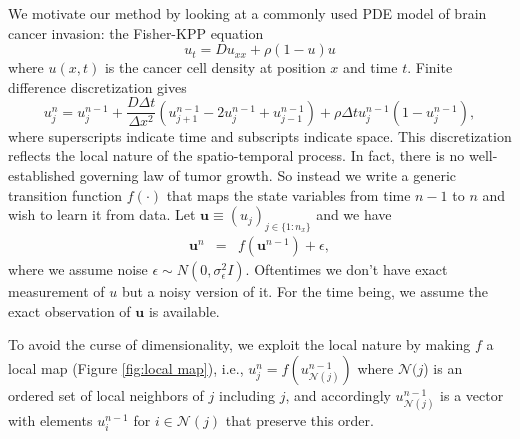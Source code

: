 \documentclass[smallextended,natbib]{svjour3}       %
\begin{document}
We motivate our method by looking at a commonly used PDE model of brain cancer invasion: the Fisher-KPP equation
\[
u_{t}=Du_{xx}+\rho (1-u)u
\]
where $u(x,t)$ is the cancer cell density at position $x$ and time $t$. Finite difference discretization gives 
\[
u_{j}^{n}=u_{j}^{n-1}+\frac{D \Delta t}{\Delta x^{2}}(u_{j+1}^{n-1}-2u_{j}^{n-1}+u_{j-1}^{n-1})+\rho \Delta t u_{j}^{n-1}(1-u_{j}^{n-1}),
\]
where superscripts indicate time and subscripts indicate space. This discretization reflects the local nature of the spatio-temporal process. In fact, there is no well-established governing law of tumor growth. So instead we write a generic transition function $f(\cdot)$ that maps the state variables from time $n-1$ to $n$ and wish to learn it from data. Let $\mathbf{u}\equiv(u_{j})_{j\in\{1:n_{x}\}}$ and we have 
\begin{eqnarray}
\mathbf{u}^{n} & = & f(\mathbf{u}^{n-1})+\epsilon\label{eq:un=00003Df(un-1)},
\end{eqnarray}
where we assume noise $\epsilon\sim N(0,\sigma_{\epsilon}^{2}I)$. Oftentimes we don't have exact measurement of $u$ but a noisy version of it. For the time being, we assume the exact observation of $\mathbf{u}$ is available.

To avoid the curse of dimensionality, we exploit the local nature by making $f$ a local map (Figure \ref{fig:local map}), i.e., $u_{j}^{n}=f(u_{\mathcal{N}(j)}^{n-1})$ where $\mathcal{N}(j$) is an ordered set of local neighbors of $j$ including $j$, and accordingly $u_{\mathcal{N}(j)}^{n-1}$ is a vector with elements $u_{i}^{n-1}$ for $i\in\mathcal{N}(j)$ that preserve this order.
\end{document}
